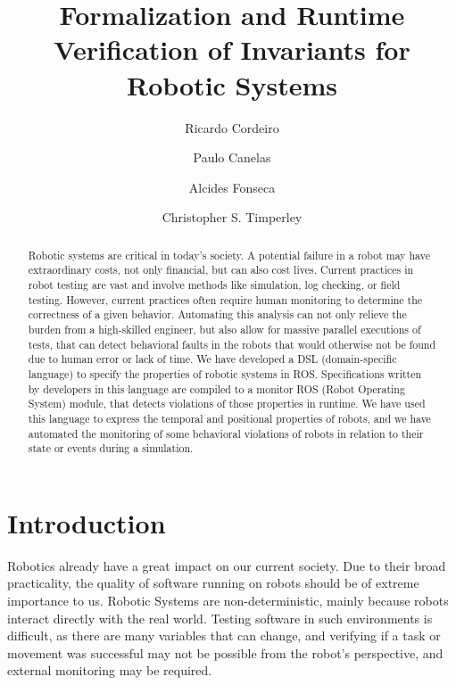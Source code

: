 \documentclass[runningheads]{llncs}
\begin{document}
%
\title{Formalization and Runtime Verification of Invariants for
Robotic Systems}
%
%
\author{Ricardo Cordeiro \and
Paulo Canelas \and
Alcides Fonseca \and
Christopher S. Timperley}
%
%
%
\maketitle              %
%
\begin{abstract}
    Robotic systems are critical in today's society. A potential failure in a robot may have extraordinary costs, not only financial, but can also cost lives.
    Current practices in robot testing are vast and involve methods like simulation, log checking, or field testing. However, current practices often require human monitoring to determine the correctness of a given behavior. Automating this analysis can not only relieve the burden from a high-skilled engineer, but also allow for massive parallel executions of tests, that can detect behavioral faults in the robots that would otherwise not be found due to human error or lack of time.
    We have developed a DSL (domain-specific language) to specify the properties of robotic systems in ROS. Specifications written by developers in this language are compiled to a monitor ROS (Robot Operating System) module, that detects violations of those properties in runtime. We have used this language to express the temporal and positional properties of robots, and we have automated the monitoring of some behavioral violations of robots in relation to their state or events during a simulation.

\end{abstract}
%
%
%
\section{Introduction}

Robotics already have a great impact on our current society. Due to their broad practicality, the quality of software running on robots should be of extreme importance to us. Robotic Systems are non-deterministic, mainly because robots interact directly with the real world. Testing software in such environments is difficult, as there are many variables that can change, and verifying if a task or movement was successful may not be possible from the robot's perspective, and external monitoring may be required.
\end{document}
